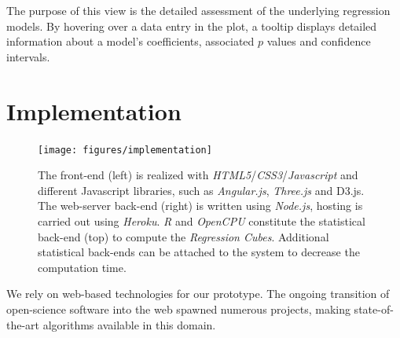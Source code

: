 \documentclass[journal]{style/vgtc} 			          %
\begin{document}
The purpose of this view is the detailed assessment of the underlying regression models.
By hovering over a data entry in the plot, a tooltip displays detailed information about a model's coefficients, associated $p$ values and confidence intervals.

\section{Implementation} \label{implementation}
\begin{figure}[htb]
 \centering
 \texttt{[image: figures/implementation]}
 \caption{
 The front-end (left) is realized with \emph{HTML5}/\emph{CSS3}/\emph{Javascript} and different Javascript libraries, such as \emph{Angular.js}, \emph{Three.js} and D3.js.
 The web-server back-end (right) is written using \emph{Node.js}, hosting is carried out using \emph{Heroku}.
 \emph{R} and \emph{OpenCPU} constitute the statistical back-end (top) to compute the \emph{Regression Cubes}.
 Additional statistical back-ends can be attached to the system to decrease the computation time.
 }
  \label{fig:Implementation}
\end{figure}
We rely on web-based technologies for our prototype.
The ongoing transition of open-science software into the web spawned numerous projects, making state-of-the-art algorithms available in this domain.
\end{document}
